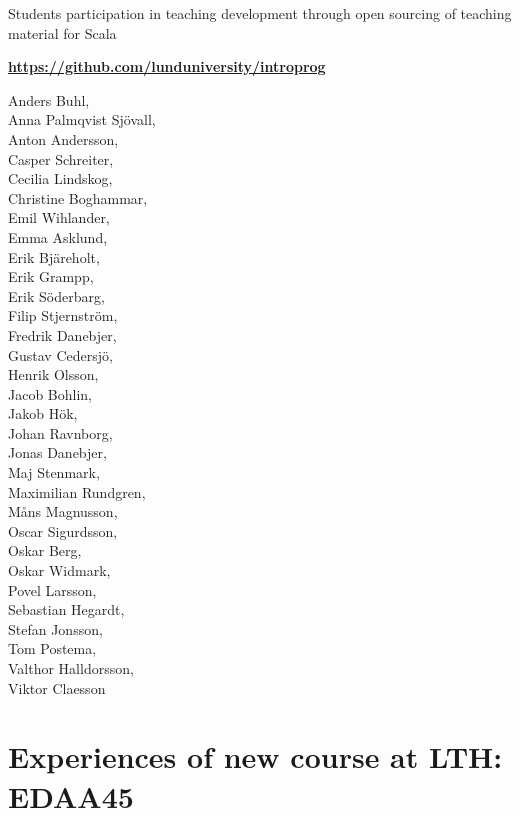 \documentclass{lecturenotes}
\begin{document}
\begin{Slide}{Students participation in teaching development through open sourcing of teaching material for Scala}

\textbf{\url{https://github.com/lunduniversity/introprog}}

\begin{multicols}{3}\footnotesize
Anders Buhl, \\Anna Palmqvist Sjövall, \\Anton Andersson, \\Casper Schreiter, \\Cecilia Lindskog, \\Christine Boghammar, \\Emil Wihlander, \\Emma Asklund, \\Erik Bjäreholt, \\Erik Grampp, \\Erik Söderbarg, \\Filip Stjernström, \\Fredrik Danebjer, \\Gustav Cedersjö, \\Henrik Olsson, \\Jacob Bohlin, \\Jakob Hök, \\Johan Ravnborg, \\Jonas Danebjer, \\Maj Stenmark, \\Maximilian Rundgren, \\Måns Magnusson, \\Oscar Sigurdsson, \\Oskar Berg, \\Oskar Widmark, \\Povel Larsson, \\Sebastian Hegardt, \\Stefan Jonsson, \\Tom Postema, \\Valthor Halldorsson, \\Viktor Claesson
\end{multicols}

\end{Slide}



\section{Experiences of new course at LTH: EDAA45}
\end{document}

